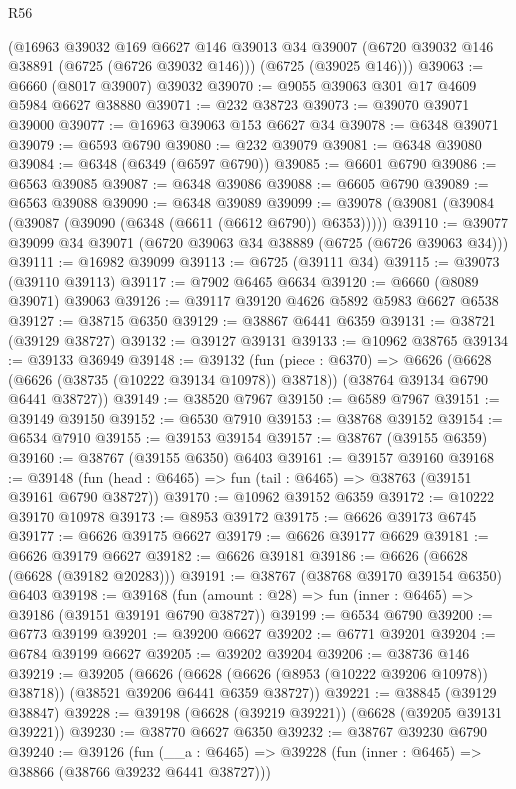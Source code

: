 \begin{lexlean}{R56}
\begin{coremodule}
    (@16963
      @39032
      @169
      @6627
      @146
      @39013
      @34
      @39007
      (@6720 @39032 @146 @38891 (@6725 (@6726 @39032 @146)))
      (@6725 (@39025 @146)))
@39063 := @6660 (@8017 @39007) @39032
@39070 := @9055 @39063 @301 @17 @4609 @5984 @6627 @38880
@39071 := @232 @38723
@39073 := @39070 @39071 @39000
@39077 := @16963 @39063 @153 @6627 @34
@39078 := @6348 @39071
@39079 := @6593 @6790
@39080 := @232 @39079
@39081 := @6348 @39080
@39084 := @6348 (@6349 (@6597 @6790))
@39085 := @6601 @6790
@39086 := @6563 @39085
@39087 := @6348 @39086
@39088 := @6605 @6790
@39089 := @6563 @39088
@39090 := @6348 @39089
@39099 := @39078 (@39081 (@39084 (@39087 (@39090 (@6348 (@6611 (@6612 @6790)) @6353)))))
@39110 := @39077 @39099 @34 @39071 (@6720 @39063 @34 @38889 (@6725 (@6726 @39063 @34)))
@39111 := @16982 @39099
@39113 := @6725 (@39111 @34)
@39115 := @39073 (@39110 @39113)
@39117 := @7902 @6465 @6634
@39120 := @6660 (@8089 @39071) @39063
@39126 := @39117 @39120 @4626 @5892 @5983 @6627 @6538
@39127 := @38715 @6350
@39129 := @38867 @6441 @6359
@39131 := @38721 (@39129 @38727)
@39132 := @39127 @39131
@39133 := @10962 @38765
@39134 := @39133 @36949
@39148 := @39132
    (fun (piece : @6370) =>
    @6626 (@6628 (@6626 (@38735 (@10222 @39134 @10978)) @38718)) (@38764 @39134 @6790 @6441 @38727))
@39149 := @38520 @7967
@39150 := @6589 @7967
@39151 := @39149 @39150
@39152 := @6530 @7910
@39153 := @38768 @39152
@39154 := @6534 @7910
@39155 := @39153 @39154
@39157 := @38767 (@39155 @6359)
@39160 := @38767 (@39155 @6350) @6403
@39161 := @39157 @39160
@39168 := @39148 (fun (head : @6465) => fun (tail : @6465) => @38763 (@39151 @39161 @6790 @38727))
@39170 := @10962 @39152 @6359
@39172 := @10222 @39170 @10978
@39173 := @8953 @39172
@39175 := @6626 @39173 @6745
@39177 := @6626 @39175 @6627
@39179 := @6626 @39177 @6629
@39181 := @6626 @39179 @6627
@39182 := @6626 @39181
@39186 := @6626 (@6628 (@6628 (@39182 @20283)))
@39191 := @38767 (@38768 @39170 @39154 @6350) @6403
@39198 := @39168 (fun (amount : @28) => fun (inner : @6465) => @39186 (@39151 @39191 @6790 @38727))
@39199 := @6534 @6790
@39200 := @6773 @39199
@39201 := @39200 @6627
@39202 := @6771 @39201
@39204 := @6784 @39199 @6627
@39205 := @39202 @39204
@39206 := @38736 @146
@39219 := @39205
    (@6626 (@6628 (@6626 (@8953 (@10222 @39206 @10978)) @38718)) (@38521 @39206 @6441 @6359 @38727))
@39221 := @38845 (@39129 @38847)
@39228 := @39198 (@6628 (@39219 @39221)) (@6628 (@39205 @39131 @39221))
@39230 := @38770 @6627 @6350
@39232 := @38767 @39230 @6790
@39240 := @39126
    (fun (__a : @6465) => @39228 (fun (inner : @6465) => @38866 (@38766 @39232 @6441 @38727)))

\end{coremodule}
\end{lexlean}
